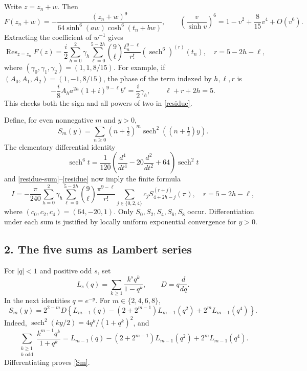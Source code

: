 \documentclass[11pt]{article}
\newcommand{\sech}{\operatorname{sech}}
\newcommand{\Res}{\operatorname{Res}}
\begin{document}
Write $z=z_n+w$. Then
\[
 F(z_n+w)=-\frac{(z_n+w)^9}{64\sinh^6(aw)\cosh^6(t_n+bw)},
 \qquad
 \left(\frac{v}{\sinh v}\right)^6
       =1-v^2+\frac8{15}v^4+O(v^6).
\]
Extracting the coefficient of $w^{-1}$ gives
\begin{equation}\label{residue}
 \Res_{z=z_n}F(z)=\frac i2\sum_{h=0}^2\gamma_h
   \sum_{\ell=0}^{5-2h}\binom9\ell
        \frac{t_n^{9-\ell}}{r!}
          (\sech^6)^{(r)}(t_n),
 \quad r=5-2h-\ell,
\end{equation}
where $(\gamma_0,\gamma_1,\gamma_2)=(1,1,8/15)$.
For example, if $(A_0,A_1,A_2)=(1,-1,8/15)$, the phase of the
term indexed by $h,\ell,r$ is
\[
 -\frac{i}{8}A_h a^{2h}(1+i)^{9-\ell}b^r
          =\frac i2\gamma_h,
 \qquad \ell+r+2h=5.
\]
This checks both the sign and all powers of two in \eqref{residue}.

Define, for even nonnegative $m$ and $y>0$,
\[
 S_m(y)=\sum_{n\ge0}(n+\tfrac12)^m
                         \sech^2((n+\tfrac12)y).
\]
The elementary differential identity
\[
 \sech^6t=\frac1{120}
       \left(\frac{d^4}{dt^4}-20\frac{d^2}{dt^2}+64\right)\sech^2t
\]
and \eqref{residue-sum}--\eqref{residue} now imply the finite formula
\begin{equation}\label{finite}
 I=-\frac\pi{240}\sum_{h=0}^2\gamma_h
       \sum_{\ell=0}^{5-2h}\binom9\ell\frac{\pi^{9-\ell}}{r!}
       \sum_{j\in\{0,2,4\}}c_j
                     S_{4+2h-j}^{(r+j)}(\pi),
 \quad r=5-2h-\ell,
\end{equation}
where $(c_0,c_2,c_4)=(64,-20,1)$.
Only $S_0,S_2,S_4,S_6,S_8$ occur. Differentiation under each sum
is justified by locally uniform exponential convergence for $y>0$.

\subsection*{2. The five sums as Lambert series}
For $|q|<1$ and positive odd $s$, set
\[
 L_s(q)=\sum_{k\ge1}\frac{k^s q^k}{1-q^k},\qquad D=q\frac d{dq}.
\]
In the next identities $q=e^{-y}$. For $m\in\{2,4,6,8\}$,
\begin{equation}\label{Sm}
 S_m(y)=2^{2-m}D\left\{L_{m-1}(q)
       -(2+2^{m-1})L_{m-1}(q^2)+2^mL_{m-1}(q^4)\right\}.
\end{equation}
Indeed, $\sech^2(ky/2)=4q^k/(1+q^k)^2$, and
\[
 \sum_{\substack{k\ge1\\k\text{ odd}}}
       \frac{k^{m-1}q^k}{1+q^k}
 =L_{m-1}(q)-(2+2^{m-1})L_{m-1}(q^2)
                        +2^mL_{m-1}(q^4).
\]
Differentiating proves \eqref{Sm}.
\end{document}
